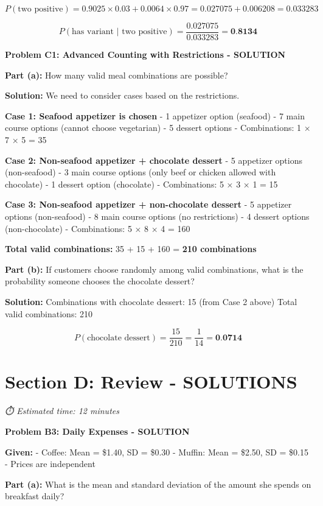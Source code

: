 \documentclass[
  11pt,
]{article}
\begin{document}
\[P(\text{two positive}) = 0.9025 \times 0.03 + 0.0064 \times 0.97 = 0.027075 + 0.006208 = 0.033283\]

\[P(\text{has variant | two positive}) = \frac{0.027075}{0.033283} = \textbf{0.8134}\]

\textbf{Problem C1: Advanced Counting with Restrictions - SOLUTION}

\textbf{Part (a):} How many valid meal combinations are possible?

\textbf{Solution:} We need to consider cases based on the restrictions.

\textbf{Case 1: Seafood appetizer is chosen} - 1 appetizer option
(seafood) - 7 main course options (cannot choose vegetarian) - 5 dessert
options - Combinations: 1 × 7 × 5 = 35

\textbf{Case 2: Non-seafood appetizer + chocolate dessert} - 5 appetizer
options (non-seafood) - 3 main course options (only beef or chicken
allowed with chocolate) - 1 dessert option (chocolate) - Combinations: 5
× 3 × 1 = 15

\textbf{Case 3: Non-seafood appetizer + non-chocolate dessert} - 5
appetizer options (non-seafood) - 8 main course options (no
restrictions) - 4 dessert options (non-chocolate) - Combinations: 5 × 8
× 4 = 160

\textbf{Total valid combinations:} 35 + 15 + 160 = \textbf{210
combinations}

\textbf{Part (b):} If customers choose randomly among valid
combinations, what is the probability someone chooses the chocolate
dessert?

\textbf{Solution:} Combinations with chocolate dessert: 15 (from Case 2
above) Total valid combinations: 210

\[P(\text{chocolate dessert}) = \frac{15}{210} = \frac{1}{14} = \textbf{0.0714}\]

\section{Section D: Review -
SOLUTIONS}\label{section-d-review---solutions}

\emph{⏱️ Estimated time: 12 minutes}

\textbf{Problem B3: Daily Expenses - SOLUTION}

\textbf{Given:} - Coffee: Mean = \$1.40, SD = \$0.30 - Muffin: Mean =
\$2.50, SD = \$0.15 - Prices are independent

\textbf{Part (a):} What is the mean and standard deviation of the amount
she spends on breakfast daily?
\end{document}
